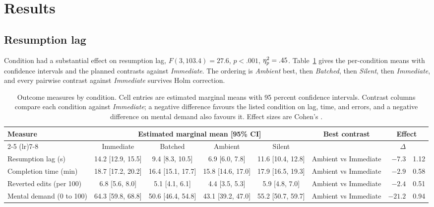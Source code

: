 \section{Results}
\label{sec:results}

\subsection{Resumption lag}

Condition had a substantial effect on resumption lag,
$F(3, 103.4) = 27.6$, $p < .001$, $\eta_p^2 = .45$. Table~\ref{tab:stats} gives
the per-condition means with confidence intervals and the planned contrasts
against \emph{Immediate}. The ordering is \emph{Ambient} best,
then \emph{Batched}, then \emph{Silent}, then \emph{Immediate}, and every
pairwise contrast against \emph{Immediate} survives Holm correction.

\begin{table}[t]
  \centering
  \footnotesize
  \setlength{\tabcolsep}{3.6pt}
  \caption{Outcome measures by condition. Cell entries are estimated marginal
  means with 95 percent confidence intervals. Contrast columns compare each
  condition against \emph{Immediate}; a negative difference favours the listed
  condition on lag, time, and errors, and a negative difference on mental
  demand also favours it. Effect sizes are Cohen's \cohensd{}.}
  \label{tab:stats}
  \begin{tabular}{l cccc c rr}
    \toprule
    \multirow{2}{*}{Measure}
      & \multicolumn{4}{c}{Estimated marginal mean [95\% CI]}
      & \multirow{2}{*}{Best contrast}
      & \multicolumn{2}{c}{Effect} \\
    \cmidrule(lr){2-5} \cmidrule(lr){7-8}
      & Immediate & Batched & Ambient & Silent & & $\Delta$ & \cohensd{} \\
    \midrule
    Resumption lag (s)
      & 14.2 [12.9, 15.5] & 9.4 [8.3, 10.5] & 6.9 [6.0, 7.8] & 11.6 [10.4, 12.8]
      & Ambient vs Immediate & $-7.3$ & 1.12 \\
    Completion time (min)
      & 18.7 [17.2, 20.2] & 16.4 [15.1, 17.7] & 15.8 [14.6, 17.0] & 17.9 [16.5, 19.3]
      & Ambient vs Immediate & $-2.9$ & 0.58 \\
    Reverted edits (per 100)
      & 6.8 [5.6, 8.0] & 5.1 [4.1, 6.1] & 4.4 [3.5, 5.3] & 5.9 [4.8, 7.0]
      & Ambient vs Immediate & $-2.4$ & 0.51 \\
    Mental demand (0 to 100)
      & 64.3 [59.8, 68.8] & 50.6 [46.4, 54.8] & 43.1 [39.2, 47.0] & 55.2 [50.7, 59.7]
      & Ambient vs Immediate & $-21.2$ & 0.94 \\
    \bottomrule
  \end{tabular}
\end{table}

